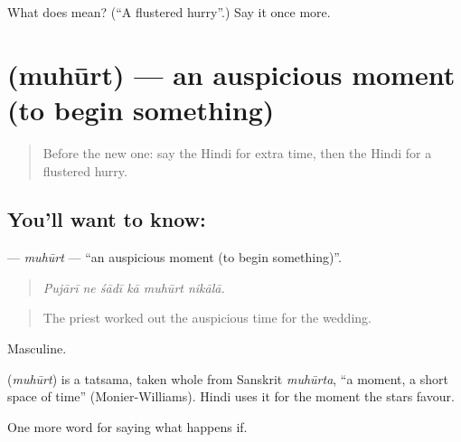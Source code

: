 \begin{tcolorbox}[breakable,colback=teal!4,colframe=teal!35!black,title={Before you move on}]
What does  mean? (\textquotedblleft{}A flustered hurry\textquotedblright{}.) Say it once more.
\end{tcolorbox}
\section[\texorpdfstring{\hi{मुहूर्त} (muhūrt)}{मुहूर्त (muhūrt)}]{ (muhūrt) — an auspicious moment (to begin something)}

\label{lesson:HI-C537-muhurt}



\begin{quote}
Before the new one: say the Hindi for extra time, then the Hindi for a flustered hurry.
\end{quote}

\subsection*{You'll want to know: }
\textbf{} — \emph{muhūrt} — \textquotedblleft{}an auspicious moment (to begin something)\textquotedblright{}.

\begin{quote}
     
\end{quote}

\begin{quote}
\emph{Pujārī ne śādī kā muhūrt nikālā.}
\end{quote}

\begin{quote}
The priest worked out the auspicious time for the wedding.
\end{quote}

Masculine.

\begin{cousinweb}
\textbf{} (\emph{muhūrt}) is a tatsama, taken whole from Sanskrit \emph{muhūrta}, \textquotedblleft{}a moment, a short space of time\textquotedblright{} (Monier-Williams). Hindi uses it for the moment the stars favour.
\end{cousinweb}

\begin{grammarlens}[title={What you've built}]
One more word for saying what happens if.
\end{grammarlens}

